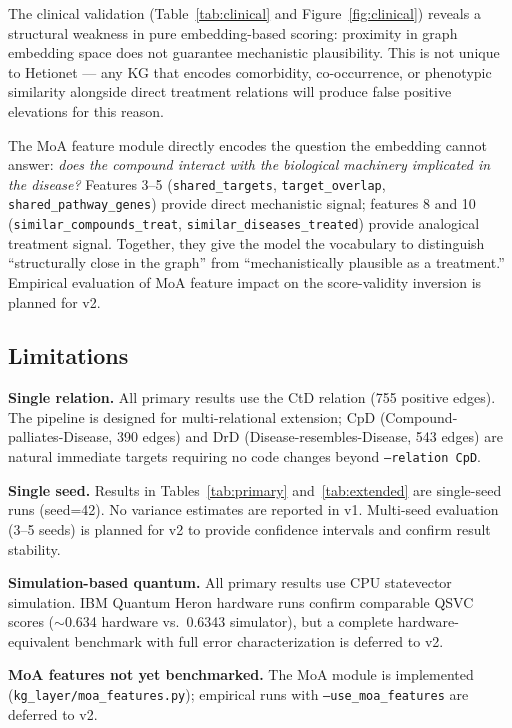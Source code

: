 \documentclass[10pt,twocolumn]{article}
\begin{document}
The clinical validation (Table~\ref{tab:clinical} and Figure~\ref{fig:clinical}) reveals a structural weakness in pure embedding-based scoring: proximity in graph embedding space does not guarantee mechanistic plausibility. This is not unique to Hetionet --- any KG that encodes comorbidity, co-occurrence, or phenotypic similarity alongside direct treatment relations will produce false positive elevations for this reason.

The MoA feature module directly encodes the question the embedding cannot answer: \textit{does the compound interact with the biological machinery implicated in the disease?} Features 3--5 (\texttt{shared\_targets}, \texttt{target\_overlap}, \texttt{shared\_pathway\_genes}) provide direct mechanistic signal; features 8 and 10 (\texttt{similar\_compounds\_treat}, \texttt{similar\_diseases\_treated}) provide analogical treatment signal. Together, they give the model the vocabulary to distinguish ``structurally close in the graph'' from ``mechanistically plausible as a treatment.'' Empirical evaluation of MoA feature impact on the score-validity inversion is planned for v2.

\subsection{Limitations}

\textbf{Single relation.} All primary results use the CtD relation (755 positive edges). The pipeline is designed for multi-relational extension; CpD (Compound-palliates-Disease, 390 edges) and DrD (Disease-resembles-Disease, 543 edges) are natural immediate targets requiring no code changes beyond \texttt{--relation CpD}.

\textbf{Single seed.} Results in Tables~\ref{tab:primary} and~\ref{tab:extended} are single-seed runs (seed=42). No variance estimates are reported in v1. Multi-seed evaluation (3--5 seeds) is planned for v2 to provide confidence intervals and confirm result stability.

\textbf{Simulation-based quantum.} All primary results use CPU statevector simulation. IBM Quantum Heron hardware runs confirm comparable QSVC scores (${\sim}$0.634 hardware vs.\ 0.6343 simulator), but a complete hardware-equivalent benchmark with full error characterization is deferred to v2.

\textbf{MoA features not yet benchmarked.} The MoA module is implemented (\texttt{kg\_layer/moa\_features.py}); empirical runs with \texttt{--use\_moa\_features} are deferred to v2.
\end{document}
